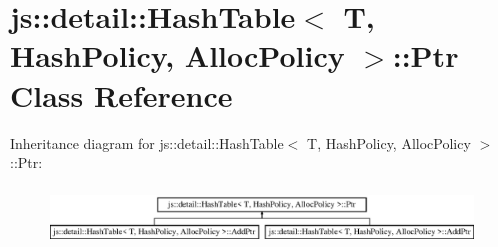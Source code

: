 \hypertarget{classjs_1_1detail_1_1_hash_table_1_1_ptr}{\section{js\-:\-:detail\-:\-:Hash\-Table$<$ T, Hash\-Policy, Alloc\-Policy $>$\-:\-:Ptr Class Reference}
\label{classjs_1_1detail_1_1_hash_table_1_1_ptr}
}
Inheritance diagram for js\-:\-:detail\-:\-:Hash\-Table$<$ T, Hash\-Policy, Alloc\-Policy $>$\-:\-:Ptr\-:\begin{figure}[H]
\begin{center}
\leavevmode
\includegraphics[height=1.586402cm]{classjs_1_1detail_1_1_hash_table_1_1_ptr}
\end{center}
\end{figure}
